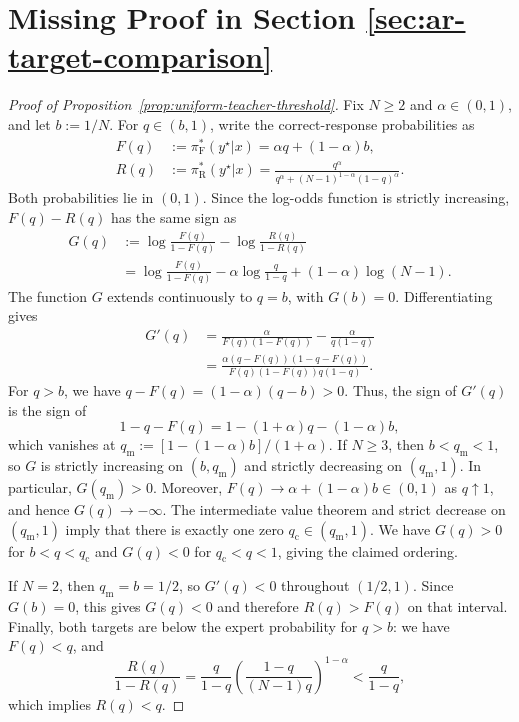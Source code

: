 \documentclass[11pt]{article}
\newcommand{\pif}{\pi_{\mathrm{F}}}
\newcommand{\pir}{\pi_{\mathrm{R}}}
\begin{document}
\section{Missing Proof in Section \ref{sec:ar-target-comparison}}
\label{sec:proof-target-comparison}
\label{sec:proof-uniform-threshold}
\begin{proof}[Proof of Proposition~\ref{prop:uniform-teacher-threshold}]
Fix $N\geq2$ and $\alpha\in(0,1)$, and let $b:=1/N$. For $q\in(b,1)$, write the correct-response probabilities as
\begin{align*}
    F(q)&:=\pif^*(y^\star|x)=\alpha q+(1-\alpha)b,\\
    R(q)&:=\pir^*(y^\star|x)
    =\frac{q^\alpha}{q^\alpha+(N-1)^{1-\alpha}(1-q)^\alpha}.
\end{align*}
Both probabilities lie in $(0,1)$. Since the log-odds function is strictly increasing, $F(q)-R(q)$ has the same sign as
\begin{align*}
    G(q)&:=\log\frac{F(q)}{1-F(q)}-\log\frac{R(q)}{1-R(q)}\\
    &=\log\frac{F(q)}{1-F(q)}-\alpha\log\frac{q}{1-q}
      +(1-\alpha)\log(N-1).
\end{align*}
The function $G$ extends continuously to $q=b$, with $G(b)=0$. Differentiating gives
\begin{align*}
    G'(q)
    &=\frac{\alpha}{F(q)(1-F(q))}-\frac{\alpha}{q(1-q)}\\
    &=\frac{\alpha(q-F(q))(1-q-F(q))}
    {F(q)(1-F(q))q(1-q)}.
\end{align*}
For $q>b$, we have $q-F(q)=(1-\alpha)(q-b)>0$. Thus, the sign of $G'(q)$ is the sign of
\[
    1-q-F(q)=1-(1+\alpha)q-(1-\alpha)b,
\]
which vanishes at $q_{\mathrm m}:=[1-(1-\alpha)b]/(1+\alpha)$.
If $N\geq3$, then $b<q_{\mathrm m}<1$, so $G$ is strictly increasing on $(b,q_{\mathrm m})$ and strictly decreasing on $(q_{\mathrm m},1)$. In particular, $G(q_{\mathrm m})>0$. Moreover, $F(q)\to\alpha+(1-\alpha)b\in(0,1)$ as $q\uparrow1$, and hence $G(q)\to-\infty$. The intermediate value theorem and strict decrease on $(q_{\mathrm m},1)$ imply that there is exactly one zero $q_{\mathrm c}\in(q_{\mathrm m},1)$. We have $G(q)>0$ for $b<q<q_{\mathrm c}$ and $G(q)<0$ for $q_{\mathrm c}<q<1$, giving the claimed ordering.

If $N=2$, then $q_{\mathrm m}=b=1/2$, so $G'(q)<0$ throughout $(1/2,1)$. Since $G(b)=0$, this gives $G(q)<0$ and therefore $R(q)>F(q)$ on that interval.
Finally, both targets are below the expert probability for $q>b$: we have $F(q)<q$, and
\[
    \frac{R(q)}{1-R(q)}
    =\frac{q}{1-q}
      \left(\frac{1-q}{(N-1)q}\right)^{1-\alpha}
    <\frac{q}{1-q},
\]
which implies $R(q)<q$.
\end{proof}
\end{document}

